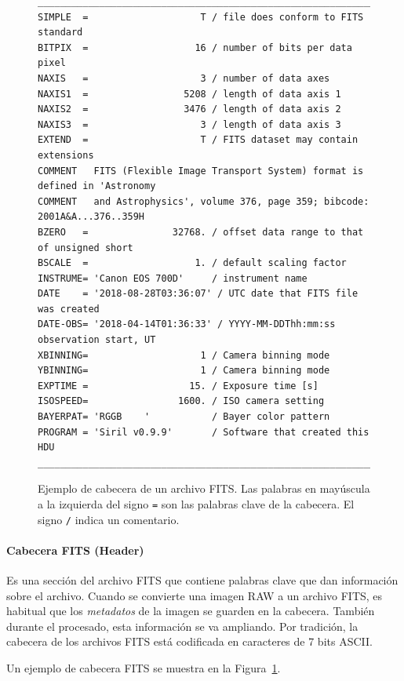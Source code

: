 \documentclass[a4paper, 12pt]{article}
\begin{document}
\begin{figure}[!htb]
\begin{verbatim}
___________________________________________________________________
SIMPLE  =                    T / file does conform to FITS standard
BITPIX  =                   16 / number of bits per data pixel
NAXIS   =                    3 / number of data axes
NAXIS1  =                 5208 / length of data axis 1
NAXIS2  =                 3476 / length of data axis 2
NAXIS3  =                    3 / length of data axis 3
EXTEND  =                    T / FITS dataset may contain extensions
COMMENT   FITS (Flexible Image Transport System) format is defined in 'Astronomy
COMMENT   and Astrophysics', volume 376, page 359; bibcode: 2001A&A...376..359H
BZERO   =               32768. / offset data range to that of unsigned short
BSCALE  =                   1. / default scaling factor
INSTRUME= 'Canon EOS 700D'     / instrument name
DATE    = '2018-08-28T03:36:07' / UTC date that FITS file was created
DATE-OBS= '2018-04-14T01:36:33' / YYYY-MM-DDThh:mm:ss observation start, UT
XBINNING=                    1 / Camera binning mode
YBINNING=                    1 / Camera binning mode
EXPTIME =                  15. / Exposure time [s]
ISOSPEED=                1600. / ISO camera setting
BAYERPAT= 'RGGB    '           / Bayer color pattern
PROGRAM = 'Siril v0.9.9'       / Software that created this HDU
___________________________________________________________________
\end{verbatim}
\caption{Ejemplo de cabecera de un archivo FITS. Las palabras en mayúscula a la izquierda del signo {\tt =} son las palabras clave de la cabecera. El signo {\tt /} indica un comentario. \label{fig:header}}
\end{figure}

  
\paragraph{Cabecera FITS (Header)}
Es una sección del archivo FITS que contiene palabras clave que dan información sobre el archivo. Cuando se convierte una imagen RAW a un archivo FITS, es habitual que los {\it metadatos} de la imagen se guarden en la cabecera. También durante el procesado, esta información se va ampliando. Por tradición, la cabecera de los archivos FITS está codificada en caracteres de 7 bits ASCII.



Un ejemplo de cabecera FITS se muestra en la Figura~\ref{fig:header}.
\end{document}
